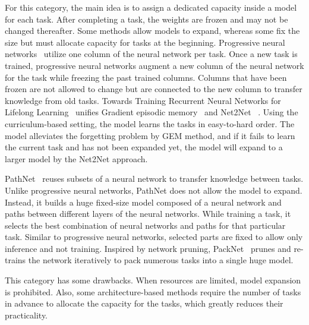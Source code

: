 \documentclass{article} %
\begin{document}
For this category, the main idea is to assign a dedicated capacity inside a model for each task.
After completing a task, the weights are frozen and may not be changed thereafter.
Some methods allow models to expand, whereas some fix the size but must allocate capacity for tasks at the beginning.
Progressive neural networks~\citep{rusu2016progressive} utilize one column of the neural network per task.
Once a new task is trained, progressive neural networks augment a new column of the neural network for the task while freezing the past trained columns.
Columns that have been frozen are not allowed to change but are connected to the new column to transfer knowledge from old tasks.
Towards Training Recurrent Neural Networks for Lifelong Learning~\citep{sodhani2018training} unifies Gradient episodic memory~\citep{lopez2017gradient} and Net2Net ~\citep{chen2015net2net}.
Using the curriculum-based setting, the model learns the tasks in easy-to-hard order.
The model alleviates the forgetting problem by GEM method, and if it fails to learn the current task and has not been expanded yet, the model will expand to a larger model by the Net2Net approach.

PathNet~\citep{fernando2017pathnet} reuses subsets of a neural network to transfer knowledge between tasks. Unlike progressive neural networks, PathNet does not allow the model to expand. Instead, it builds a huge fixed-size model composed of a neural network and paths between different layers of the neural networks. While training a task, it selects the best combination of neural networks and paths for that particular task.
Similar to progressive neural networks, selected parts are fixed to allow only inference and not training. 
Inspired by network pruning, PackNet~\citep{mallya2018packnet}  prunes and re-trains the network iteratively to pack numerous tasks into a single huge model.


This category has some drawbacks. 
When resources are limited, model expansion is prohibited.
Also, some architecture-based methods require the number of tasks in advance to allocate the capacity for the tasks, which greatly reduces their practicality.

\end{document}
